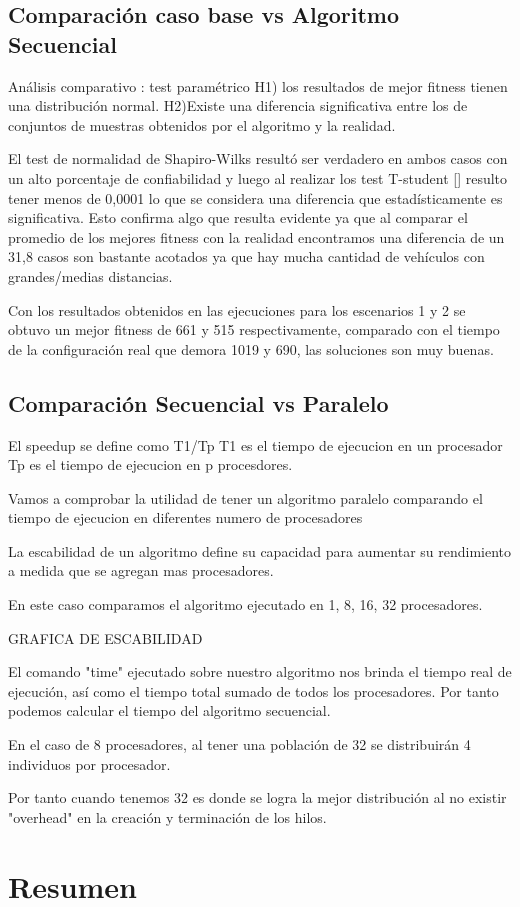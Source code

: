 \subsection{Comparación caso base vs Algoritmo Secuencial}
Análisis comparativo : test paramétrico
H1)  los  resultados  de  mejor  fitness  tienen  una distribución normal.
H2)Existe  una  diferencia  significativa  entre  los  de conjuntos  de  muestras  obtenidos  por  el  algoritmo  y  la realidad.

El  test  de  normalidad  de  Shapiro-Wilks  resultó  ser verdadero  en  ambos  casos  con  un  alto  porcentaje  de
confiabilidad y luego al realizar los test T-student [] resulto tener menos de 0,0001 lo que se considera una diferencia que
estadísticamente  es  significativa.  Esto confirma algo que resulta evidente ya que al comparar
el promedio de los mejores fitness con la realidad encontramos
una diferencia de un 31,8%
casos  son  bastante  acotados  ya  que  hay  mucha  cantidad  de
vehículos con grandes/medias distancias.

Con  los  resultados  obtenidos  en  las  ejecuciones  para  los
escenarios  1  y  2  se  obtuvo  un  mejor  fitness  de  661  y  515
respectivamente, comparado con el tiempo de la configuración
real que demora 1019 y 690, las soluciones son muy buenas.



\subsection{Comparación Secuencial vs  Paralelo}

El speedup se define como T1/Tp
T1 es el tiempo de ejecucion en un procesador
Tp es el tiempo de ejecucion en p procesdores.


Vamos a comprobar la utilidad de tener un algoritmo paralelo comparando el tiempo de ejecucion en diferentes numero de procesadores

La escabilidad de un algoritmo define su capacidad para aumentar su rendimiento a medida que se agregan mas procesadores.

En este caso comparamos el algoritmo ejecutado en 1, 8, 16, 32 procesadores.

GRAFICA DE ESCABILIDAD

El comando "time" ejecutado sobre nuestro algoritmo nos brinda el tiempo real de ejecución, así como el tiempo total sumado de todos los procesadores. Por tanto podemos calcular el tiempo del algoritmo secuencial.

En el caso de 8 procesadores, al tener una población de 32 se distribuirán 4 individuos por procesador.

Por tanto cuando tenemos 32 es donde se logra la mejor distribución al no existir "overhead" en la creación y terminación de los hilos.


\section{Resumen}

